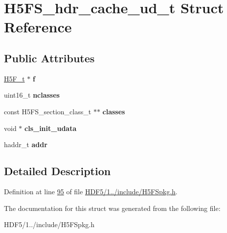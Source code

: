 \hypertarget{struct_h5_f_s__hdr__cache__ud__t}{}\section{H5\+F\+S\+\_\+hdr\+\_\+cache\+\_\+ud\+\_\+t Struct Reference}
\label{struct_h5_f_s__hdr__cache__ud__t}
\subsection*{Public Attributes}
\begin{DoxyCompactItemize}
\item 
\mbox{\label{struct_h5_f_s__hdr__cache__ud__t_a02056233b266e65efeb100903e888c89}} 
\hyperlink{struct_h5_f__t}{H5\+F\+\_\+t} $\ast$ {\bfseries f}
\item 
\mbox{\label{struct_h5_f_s__hdr__cache__ud__t_ab42f1bed3002ca5513a1b390c1922a3c}} 
uint16\+\_\+t {\bfseries nclasses}
\item 
\mbox{\label{struct_h5_f_s__hdr__cache__ud__t_abe406a22e84858affe038c4826b5819d}} 
const H5\+F\+S\+\_\+section\+\_\+class\+\_\+t $\ast$$\ast$ {\bfseries classes}
\item 
\mbox{\label{struct_h5_f_s__hdr__cache__ud__t_ae5dff9490a87e621269feedac218055b}} 
void $\ast$ {\bfseries cls\+\_\+init\+\_\+udata}
\item 
\mbox{\label{struct_h5_f_s__hdr__cache__ud__t_aec250d60003d14093761b54606159882}} 
haddr\+\_\+t {\bfseries addr}
\end{DoxyCompactItemize}


\subsection{Detailed Description}


Definition at line \hyperlink{_h_d_f5_21_810_81_2include_2_h5_f_spkg_8h_source_l00095}{95} of file \hyperlink{_h_d_f5_21_810_81_2include_2_h5_f_spkg_8h_source}{H\+D\+F5/1../include/\+H5\+F\+Spkg.\+h}.



The documentation for this struct was generated from the following file\+:\begin{DoxyCompactItemize}
\item 
H\+D\+F5/1../include/\+H5\+F\+Spkg.\+h\end{DoxyCompactItemize}
